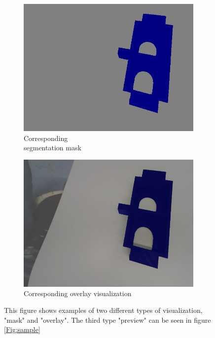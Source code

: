 \begin{itemize}
\begin{figure}[!htb]
\begin{subfigure}{.3\textwidth}
  				\includegraphics[width=.9\linewidth]{images/eg_mask}
  				\caption{Corresponding \\segmentation mask}
  				\label{Fig:visualsb}
			\end{subfigure}%
			\begin{subfigure}{.3\textwidth}
  				\centering
  				\includegraphics[width=.9\linewidth]{images/eg_overlay}
  				\caption{Corresponding overlay visualization}
  				\label{Fig:visualsc}
			\end{subfigure}%
		\caption{This figure shows examples of two different types of visualization, "mask" and "overlay". The third type "preview" can be seen in figure \ref{Fig:sample}}
		\label{Fig:visuals}
		\end{figure}
		
	\end{itemize}
	
